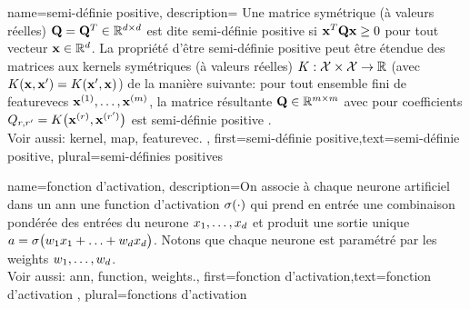 {name={semi-définie positive},
	description={
		Une matrice symétrique (à valeurs réelles) $\mathbf{Q} = \mathbf{Q}^{T} \in \mathbb{R}^{d \times d}$ 
		est dite semi-définie positive si ${\bf x}^{T} \mathbf{Q} {\bf x} \geq 0$ pour tout vecteur ${\bf x} \in \mathbb{R}^{d}$. 
		La propriété d’être semi-définie positive peut être étendue des matrices aux \glspl{kernel} symétriques (à valeurs réelles) 
		$K: \mathcal{X} \times \mathcal{X} \rightarrow \mathbb{R}$ (avec $K({\bf x},{\bf x}') = K({\bf x}',{\bf x})$)
		de la manière suivante: pour tout ensemble fini de \glspl{featurevec} ${\bf x}^{(1)},\dots,{\bf x}^{(m)}$, 
		la matrice résultante $\mathbf{Q} \in \mathbb{R}^{m \times m}$ avec pour coefficients  
		$Q_{r,r'} = K\big({\bf x}^{(r)},{\bf x}^{(r')}\big)$ 
		est semi-définie positive \cite{LearningKernelsBook}.
		\\
		Voir aussi: \gls{kernel}, \gls{map}, \gls{featurevec}.
	},
	first={semi-définie positive},text={semi-définie positive}, plural={semi-définies positives}
}

{name={fonction d'activation},
	description={On associe à chaque neurone artificiel dans un \gls{ann} 
		une \gls{function} d'activation $\sigma(\cdot)$ qui prend en entrée une combinaison pondérée 
		des entrées du neurone $x_{1},\ldots,x_{d}$ et produit une 
		sortie unique $a = \sigma\big(w_{1} x_{1}+\ldots+w_{d} x_{d} \big)$. 
		Notons que chaque neurone est paramétré par les \gls{weights} $w_{1},\ldots,w_{d}$.
		\\ 
		Voir aussi: \gls{ann}, \gls{function}, \gls{weights}.},
	first={fonction d'activation},text={fonction d'activation} , plural={fonctions d'activation}
}


